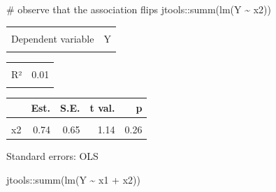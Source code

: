 \documentclass[
  letterpaper,
  DIV=11,
  numbers=noendperiod]{scrreport}
\newenvironment{Shaded}{\begin{snugshade}}{\end{snugshade}}
\newcommand{\CommentTok}[1]{\textcolor[rgb]{0.37,0.37,0.37}{#1}}
\newcommand{\FunctionTok}[1]{\textcolor[rgb]{0.28,0.35,0.67}{#1}}
\newcommand{\NormalTok}[1]{\textcolor[rgb]{0.00,0.23,0.31}{#1}}
\newcommand{\SpecialCharTok}[1]{\textcolor[rgb]{0.37,0.37,0.37}{#1}}
\begin{document}
\begin{Shaded}
\begin{Highlighting}[]
\CommentTok{\# observe that the association flips}
\NormalTok{jtools}\SpecialCharTok{::}\FunctionTok{summ}\NormalTok{(}\FunctionTok{lm}\NormalTok{(Y }\SpecialCharTok{\textasciitilde{}}\NormalTok{ x2))}
\end{Highlighting}
\end{Shaded}

\begin{table}[!h]
\centering
\begin{tabular}{lr}
\toprule
\cellcolor{gray!6}{Observations} & \cellcolor{gray!6}{100}\\
Dependent variable & Y\\
\cellcolor{gray!6}{Type} & \cellcolor{gray!6}{OLS linear regression}\\
\bottomrule
\end{tabular}
\end{table} \begin{table}[!h]
\centering
\begin{tabular}{lr}
\toprule
\cellcolor{gray!6}{F(1,98)} & \cellcolor{gray!6}{1.30}\\
R² & 0.01\\
\cellcolor{gray!6}{Adj. R²} & \cellcolor{gray!6}{0.00}\\
\bottomrule
\end{tabular}
\end{table} \begin{table}[!h]
\centering
\begin{threeparttable}
\begin{tabular}{lrrrr}
\toprule
  & Est. & S.E. & t val. & p\\
\midrule
\cellcolor{gray!6}{(Intercept)} & \cellcolor{gray!6}{2.46} & \cellcolor{gray!6}{2.13} & \cellcolor{gray!6}{1.16} & \cellcolor{gray!6}{0.25}\\
x2 & 0.74 & 0.65 & 1.14 & 0.26\\
\bottomrule
\end{tabular}
\begin{tablenotes}
\item Standard errors: OLS
\end{tablenotes}
\end{threeparttable}
\end{table}

\begin{Shaded}
\begin{Highlighting}[]
\NormalTok{jtools}\SpecialCharTok{::}\FunctionTok{summ}\NormalTok{(}\FunctionTok{lm}\NormalTok{(Y }\SpecialCharTok{\textasciitilde{}}\NormalTok{ x1 }\SpecialCharTok{+}\NormalTok{ x2))}
\end{Highlighting}
\end{Shaded}
\end{document}
